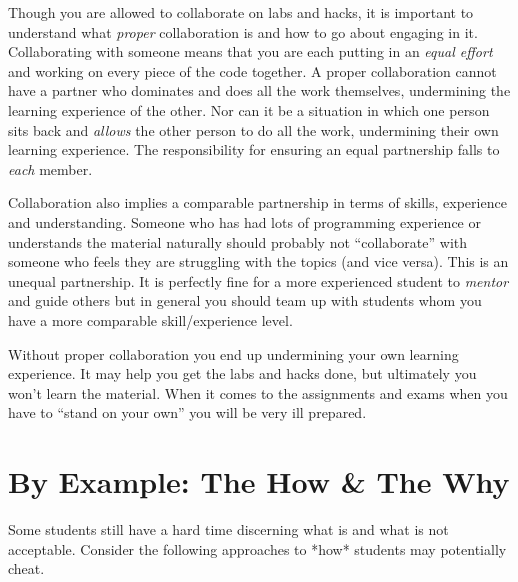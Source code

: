 \documentclass[12pt]{scrartcl}
\begin{document}
Though you are allowed to collaborate on labs and hacks, it is important to
understand what \emph{proper} collaboration is and how to go about engaging
in it.  Collaborating with someone means that you are each putting in an
\emph{equal effort} and working on every piece of the code together.
A proper collaboration cannot have a partner who dominates and does all
the work themselves, undermining the learning experience of the other.
Nor can it be a situation in which one person sits back and \emph{allows}
the other person to do all the work, undermining their own learning
experience.  The responsibility for ensuring an equal partnership falls
to \emph{each} member.

Collaboration also implies a comparable partnership in terms of skills,
experience and understanding.  Someone who has had lots of programming
experience or understands the material naturally should probably not
``collaborate'' with someone who feels they are struggling with the
topics (and vice versa).  This is an unequal partnership.  It is
perfectly fine for a more experienced student to \emph{mentor} and
guide others but in general you should team up with students whom
you have a more comparable skill/experience level.

Without proper collaboration you end up undermining your own
learning experience.  It may help you get the labs and hacks done,
but ultimately you won't learn the material.  When it comes to
the assignments and exams when you have to ``stand on your own''
you will be very ill prepared.

\section*{By Example: The How \& The Why}

Some students still have a hard time discerning what is and what
is not acceptable.  Consider the following approaches to *how*
students may potentially cheat.
\end{document}
